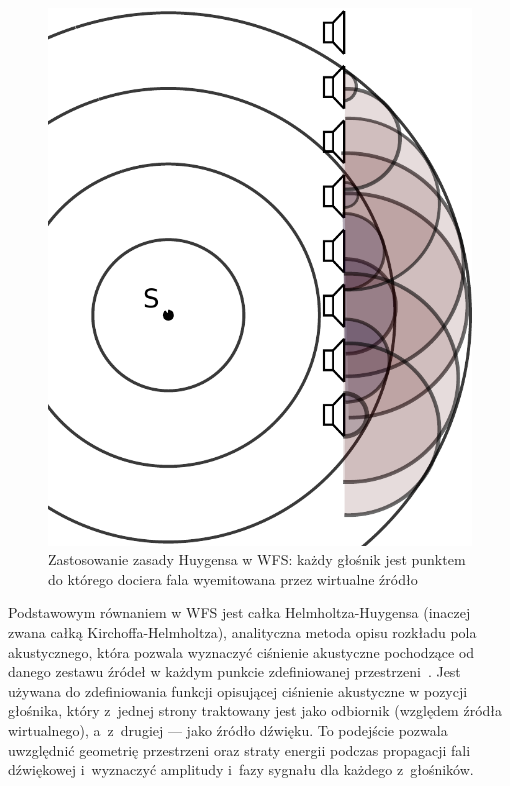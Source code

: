 \documentclass[10pt, a4paper]{article}
\begin{document}
\begin{figure}[!tbh]
  \centering
  \includegraphics[scale=.4]{vecgraphics/WFS_idea.pdf}
  \caption{Zastosowanie zasady Huygensa w WFS: każdy głośnik jest punktem do
  którego dociera fala wyemitowana przez wirtualne źródło}
  \label{r:Huygens}
\end{figure}

Podstawowym równaniem w WFS jest całka Helmholtza-Huygensa (inaczej zwana całką
Kirchoffa-Helmholtza), analityczna metoda opisu rozkładu pola akustycznego,
która pozwala wyznaczyć ciśnienie akustyczne pochodzące od danego zestawu
źródeł w każdym punkcie zdefiniowanej przestrzeni~\cite{snaka}. Jest używana do
zdefiniowania funkcji opisującej ciśnienie akustyczne w pozycji głośnika, który
z~jednej strony traktowany jest jako odbiornik (względem źródła wirtualnego),
a~z~drugiej --- jako źródło dźwięku. To podejście pozwala uwzględnić geometrię
przestrzeni oraz straty energii podczas propagacji fali dźwiękowej i~wyznaczyć
amplitudy i~fazy sygnału dla każdego z~głośników. 
\end{document}
